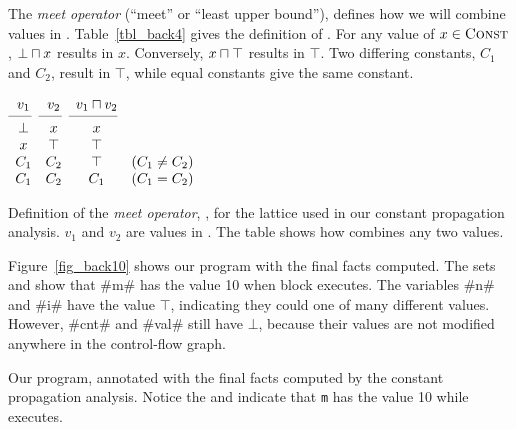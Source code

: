 \documentclass[12pt]{report}
\begin{document}
The \emph{meet operator} \lub (``meet'' or ``least upper bound''),
defines how we will combine values in \setLC. Table~\ref{tbl_back4}
gives the definition of \lub. For any value of $x \in \textsc{Const}$, $\bot
\lub x$ results in $x$. Conversely, $x \lub \top$
results in $\top$. Two differing constants, $C_1$ and $C_2$, result in
$\top$, while equal constants give the same constant.

\begin{myfig}[tbh]
  \begin{math}
    \begin{array}{cccc}
      v_1 & v_2 & v_1 \lub v_2 \\
      \cmidrule(r){1-1}\cmidrule(r){2-2}\cmidrule(r){3-3}
      \bot & x & x \\
      x & \top & \top & \\ 
      C_1 & C_2 & \top & \text{($C_1 \neq C_2$)} \\
      C_1 & C_2 & C_1 & \text{($C_1 = C_2$)}
    \end{array}
  \end{math}
  \caption{Definition of the \emph{meet operator}, \lub, for the
    lattice used in our constant propagation analysis. $v_1$ and $v_2$
    are values in \setLC. The table shows how \lub combines any two
    values.}
  \label{tbl_back4}
\end{myfig}

Figure~\ref{fig_back10} shows our program with the final facts
computed. The sets  and 
show that #m# has the value 10 when block 
executes. The variables #n# and #i# have the value $\top$, indicating
they could one of many different values. However, #cnt# and #val#
still have $\bot$, because their values are not modified anywhere in
the control-flow graph.

\begin{myfig}
  
  \label{fig_back10}
  \caption{Our program, annotated with the final facts computed by the
    constant propagation analysis. Notice the 
    and  indicate that \texttt{m} has the value 10
    while  executes.}
\end{myfig}



\end{document}
